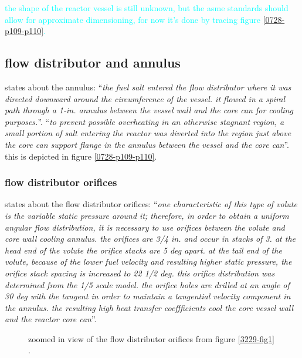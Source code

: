 \documentclass{article}
\begin{document}
\begin{preview}
\textcolor{cyan}{the shape of the reactor vessel is still unknown, but the asme standards should allow for approximate dimensioning, for now it's done by tracing figure \ref{0728-p109-p110}.}


\subsection{flow distributor and annulus}
\textcite[page 112 and 114]{ornl-tm-3039} states about the annulus: \enquote{\textit{the fuel salt entered the flow distributor where it was directed downward around the circumference of the vessel. it flowed in a spiral path through a 1-in. annulus between the vessel wall and the core can for cooling purposes.}}. \enquote{\textit{to prevent possible overheating in an otherwise stagnant region, a small portion of salt entering the reactor was diverted into the region just above the core can support flange in the annulus between the vessel and the core can}}.
this is depicted in figure \ref{0728-p109-p110}.

\subsubsection{flow distributor orifices}
\textcite[page 9-10]{ornl-tm-3229} states about the flow distributor orifices: \enquote{\textit{one characteristic of this type of volute is the variable static pressure around it; therefore, in order to obtain a uniform angular flow distribution, it is necessary to use orifices between the volute and core wall cooling annulus. the orifices are 3/4 in. and occur in stacks of 3. at the head end of the volute the orifice stacks are 5 deg apart. at the tail end of the volute, because of the lower fuel velocity and resulting higher static pressure, the orifice stack spacing is increased to 22 1/2 deg. this orifice distribution was determined from the 1/5 scale model. the orifice holes are drilled at an angle of 30 deg with the tangent in order to maintain a tangential velocity component in the annulus. the resulting high heat transfer coeffficients cool the core vessel wall and the reactor core can}}.

\begin{figure}[H]
  \centering
  \caption{zoomed in view of the flow distributor orifices from figure \ref{3229-fig1} \parencite[figure 1]{ornl-tm-3229}.}
  \label{3229-fig1-zoom}
\end{figure}



\end{preview}
\end{document}
